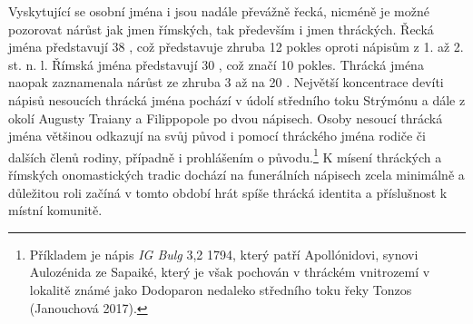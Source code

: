 Vyskytující se osobní jména i jsou nadále převážně řecká, nicméně je možné pozorovat nárůst jak jmen římských, tak především i jmen thráckých. Řecká jména představují 38 , což představuje zhruba 12  pokles oproti nápisům z 1. až 2. st. n. l. Římská jména představují 30 , což značí 10  pokles. Thrácká jména naopak zaznamenala nárůst ze zhruba 3  až na 20 . Největší koncentrace devíti nápisů nesoucích thrácká jména pochází v údolí středního toku Strýmónu a dále z okolí Augusty Traiany a Filippopole po dvou nápisech. Osoby nesoucí thrácká jména většinou odkazují na svůj původ i pomocí thráckého jména rodiče či dalších členů rodiny, případně i prohlášením o původu.\footnote{Příkladem je nápis {\em IG Bulg} 3,2 1794, který patří Apollónidovi, synovi Aulozénida ze Sapaiké, který je však pochován v thráckém vnitrozemí v lokalitě známé jako Dodoparon nedaleko středního toku řeky Tonzos (Janouchová 2017).} K mísení thráckých a římských onomastických tradic dochází na funerálních nápisech zcela minimálně a důležitou roli začíná v tomto období hrát spíše thrácká identita a příslušnost k místní komunitě.


